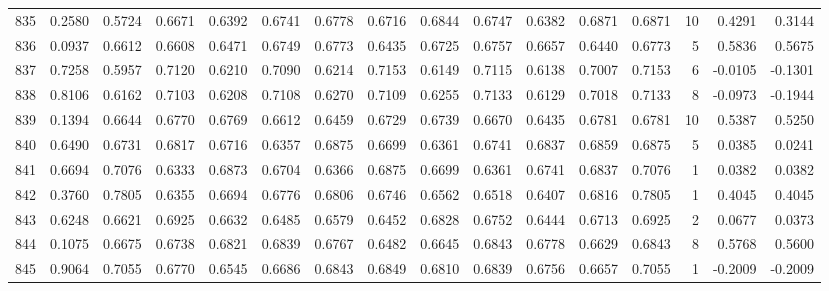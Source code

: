 \begin{tabular}{lrrrrrrrrrrrrrrr}
835 &      0.2580 &  0.5724 &  0.6671 &  0.6392 &  0.6741 &  0.6778 &  0.6716 &  0.6844 &  0.6747 &  0.6382 &   0.6871 &     0.6871 &     10 &                    0.4291 &                     0.3144 \\
836 &      0.0937 &  0.6612 &  0.6608 &  0.6471 &  0.6749 &  0.6773 &  0.6435 &  0.6725 &  0.6757 &  0.6657 &   0.6440 &     0.6773 &      5 &                    0.5836 &                     0.5675 \\
837 &      0.7258 &  0.5957 &  0.7120 &  0.6210 &  0.7090 &  0.6214 &  0.7153 &  0.6149 &  0.7115 &  0.6138 &   0.7007 &     0.7153 &      6 &                   -0.0105 &                    -0.1301 \\
838 &      0.8106 &  0.6162 &  0.7103 &  0.6208 &  0.7108 &  0.6270 &  0.7109 &  0.6255 &  0.7133 &  0.6129 &   0.7018 &     0.7133 &      8 &                   -0.0973 &                    -0.1944 \\
839 &      0.1394 &  0.6644 &  0.6770 &  0.6769 &  0.6612 &  0.6459 &  0.6729 &  0.6739 &  0.6670 &  0.6435 &   0.6781 &     0.6781 &     10 &                    0.5387 &                     0.5250 \\
840 &      0.6490 &  0.6731 &  0.6817 &  0.6716 &  0.6357 &  0.6875 &  0.6699 &  0.6361 &  0.6741 &  0.6837 &   0.6859 &     0.6875 &      5 &                    0.0385 &                     0.0241 \\
841 &      0.6694 &  0.7076 &  0.6333 &  0.6873 &  0.6704 &  0.6366 &  0.6875 &  0.6699 &  0.6361 &  0.6741 &   0.6837 &     0.7076 &      1 &                    0.0382 &                     0.0382 \\
842 &      0.3760 &  0.7805 &  0.6355 &  0.6694 &  0.6776 &  0.6806 &  0.6746 &  0.6562 &  0.6518 &  0.6407 &   0.6816 &     0.7805 &      1 &                    0.4045 &                     0.4045 \\
843 &      0.6248 &  0.6621 &  0.6925 &  0.6632 &  0.6485 &  0.6579 &  0.6452 &  0.6828 &  0.6752 &  0.6444 &   0.6713 &     0.6925 &      2 &                    0.0677 &                     0.0373 \\
844 &      0.1075 &  0.6675 &  0.6738 &  0.6821 &  0.6839 &  0.6767 &  0.6482 &  0.6645 &  0.6843 &  0.6778 &   0.6629 &     0.6843 &      8 &                    0.5768 &                     0.5600 \\
845 &      0.9064 &  0.7055 &  0.6770 &  0.6545 &  0.6686 &  0.6843 &  0.6849 &  0.6810 &  0.6839 &  0.6756 &   0.6657 &     0.7055 &      1 &                   -0.2009 &                    -0.2009 \\

\end{tabular}
